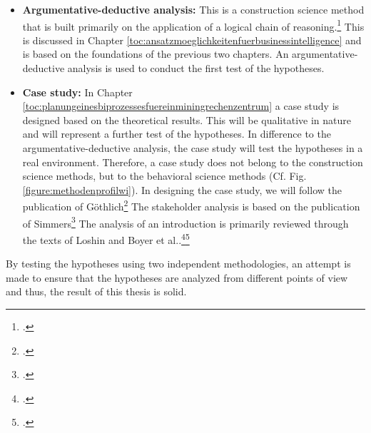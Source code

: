 \begin{itemize}
    \item \textbf{Argumentative-deductive analysis: }This is a construction science method that is built primarily on the
    application of a logical chain of reasoning.\footcite[Cf.][Tbl. 1]{wilde2007forschungsmethoden} This is discussed in Chapter
    \ref{toc:ansatzmoeglichkeitenfuerbusinessintelligence} and is based on the foundations of the previous two chapters.
    An argumentative-deductive analysis is used to conduct the first test of the hypotheses. 
    \item \textbf{Case study: }In Chapter \ref{toc:planungeinesbiprozessesfuereinminingrechenzentrum} a case study is designed based on the theoretical
    results. This will be qualitative in nature and will represent a further test of the hypotheses. In
    difference to the argumentative-deductive analysis, the case study will test the hypotheses in a real environment.
    Therefore, a case study does not belong to the construction science methods, but to the behavioral science methods
    (Cf. Fig. \ref{figure:methodenprofilwi}). In designing the case study, we will follow the publication of Göthlich\footcite[Cf.][]{gothlich2003fallstudien}
    The stakeholder analysis is based on the publication of Simmers\footcite[Cf.][]{simmers2004stakeholder}
    The analysis of an introduction is primarily reviewed through the texts of Loshin and
    Boyer et al..\footcite[Cf.][]{loshin2012business}\footcite[Cf.][]{boyer2010business}
\end{itemize} 

By testing the hypotheses using two independent methodologies, an attempt is made to ensure that the hypotheses are analyzed from different points of view
and thus, the result of this thesis is solid.
